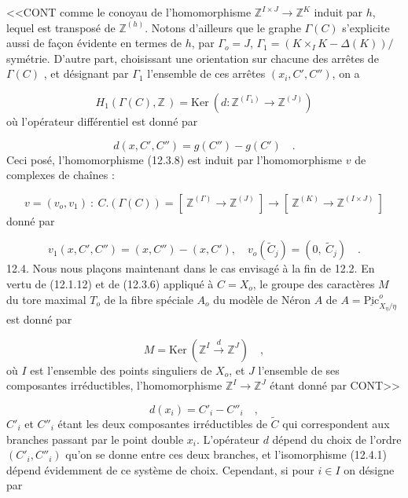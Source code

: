 <<CONT comme le conoyau de l'homomorphisme $\mathbb{Z}^{I \times J} \longrightarrow \mathbb{Z}^{K}$ induit par $h$, lequel est transposé de $\mathbb{Z}^{(h)}$. Notons d'ailleurs que le graphe $\Gamma(C)$ s'explicite aussi de façon évidente en termes de $h$, par $\Gamma_o = J$, $\Gamma_1 = (K \times_I K - \Delta(K))/$symétrie. D'autre part, choisissant une orientation sur chacune des arrêtes de $\Gamma(C)$ , et désignant par $\Gamma_1$ l'ensemble de ces arrêtes $(x_i,C',C'')$, on a

\begin{equation}\tag{12.3.11}
H_1(\Gamma(C),\mathbb{Z}\,) = \mathrm{Ker}\ (d : \mathbb{Z}^{(\Gamma_1)} \longrightarrow \mathbb{Z}^{(J)})
\end{equation}
où l'opérateur différentiel est donné par

\begin{equation}\tag{12.3.12}
d(x,C',C'') = g(C'') - g(C') \quad .
\end{equation}
Ceci posé, l'homomorphisme (12.3.8) est induit par l'homomorphisme $v$ de complexes de chaînes :

\begin{equation}\tag{12.3.13}
v = (v_o,v_1) \ : \ C.(\Gamma(C)) = \left[\ \mathbb{Z}^{(\Gamma)} \longrightarrow \mathbb{Z}^{(J)}\ \right] \to \left[\ \mathbb{Z}^{(K)} \to \mathbb{Z}^{(I \times J)}\ \right]
\end{equation}
donné par

\begin{equation}\tag{12.3.14}
v_1(x,C',C'') = (x,C'') - (x,C'), \quad v_o(\widetilde{C}_j) = (0,\ \widetilde{C}_j) \quad .
\end{equation}
12.4. Nous nous plaçons maintenant dans le cas envisagé à la fin de 12.2. En vertu de (12.1.12) et de (12.3.6) appliqué à $C = X_o$, le groupe des caractères $M$ du tore maximal $T_o$ de la fibre spéciale $A_o$ du modèle de Néron $A$ de $A = \underline{\mathrm{Pic}}^{o}_{X_\eta/\eta}$ est donné par

\begin{equation}\tag{12.4.1}
M = \mathrm{Ker}\ (\mathbb{Z}^{I} \xrightarrow{\ d\ } \mathbb{Z}^{J}) \quad ,
\end{equation}
où $I$ est l'ensemble des points singuliers de $X_o$, et $J$ l'ensemble de ses composantes irréductibles, l'homomorphisme $\mathbb{Z}^{I} \longrightarrow \mathbb{Z}^{J}$ étant donné par CONT>>



\begin{equation}\tag{12.4.2}
d(x_i) = C'_i - C''_i \quad ,
\end{equation}
$C'_i$ et $C''_i$ étant les deux composantes irréductibles de $\widetilde{C}$ qui correspondent aux branches passant par le point double $x_i$. L'opérateur $d$ dépend du choix de l'ordre $(C'_i,C''_i)$ qu'on se donne entre ces deux branches, et l'isomorphisme (12.4.1) dépend évidemment de ce système de choix. Cependant, si pour $i \in I$ on désigne par

